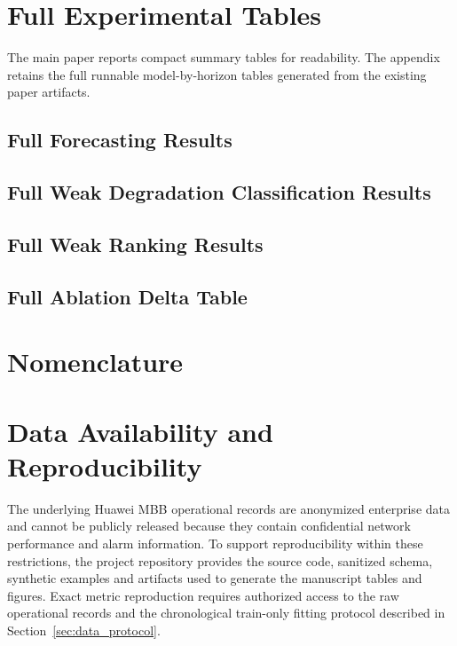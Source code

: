 \section{Full Experimental Tables}

The main paper reports compact summary tables for readability. The appendix retains the full runnable model-by-horizon tables generated from the existing paper artifacts.

\subsection{Full Forecasting Results}


\subsection{Full Weak Degradation Classification Results}


\subsection{Full Weak Ranking Results}


\subsection{Full Ablation Delta Table}


\clearpage
\section{Nomenclature}
\setcounter{table}{0}
\renewcommand{\thetable}{B.\arabic{table}}


\section{Data Availability and Reproducibility}

The underlying Huawei MBB operational records are anonymized enterprise data and cannot be publicly released because they contain confidential network performance and alarm information. To support reproducibility within these restrictions, the project repository provides the source code, sanitized schema, synthetic examples and artifacts used to generate the manuscript tables and figures. Exact metric reproduction requires authorized access to the raw operational records and the chronological train-only fitting protocol described in Section~\ref{sec:data_protocol}.
